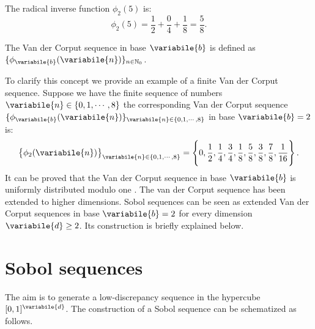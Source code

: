 The radical inverse function $\phi_2(5)$ is:
\begin{equation}
\phi_2 (5) = \frac{1}{2}+\frac{0}{4}+\frac{1}{8} = \frac{5}{8}.
\end{equation}
\begin{definition}
The Van der Corput sequence in base $\variabile{b}$ is defined as $\{ \phi_{\variabile{b}}(\variabile{n})\}_{n\in\mathbb{N}_0}$.
\end{definition}
To clarify this concept we provide an example of a finite Van der Corput sequence.
Suppose we have the finite sequence of numbers $\variabile{n}\in \{0, 1,\cdots, 8\}$  the corresponding Van der Corput sequence 
$\{ \phi_{\variabile{b}}(\variabile{n})\}_{\variabile{n}\in \{0, 1,\cdots, 8\}}$ in base $\variabile{b}=2$ is:
\begin{equation}
\big\{\phi_2(\variabile{n})\big\}_{\variabile{n}\in \{0, 1,\cdots, 8\}} = \Bigg\{0, \frac{1}{2}, \frac{1}{4}, \frac{3}{4}, \frac{1}{8},\frac{5}{8}, \frac{3}{8}, \frac{7}{8}, \frac{1}{16}\Bigg\} \,.
\end{equation}
It can be proved that the Van der Corput sequence in base $\variabile{b}$ is uniformly distributed modulo one \cite{leobacher2014introduction}. 
The van der Corput sequence has been extended to higher dimensions. 
Sobol sequences can be seen as extended Van der Corput sequences in base $\variabile{b}=2$ for every dimension $\variabile{d}\geq2$. Its construction is briefly explained below.
\section{Sobol sequences}
The aim is to generate a low-discrepancy sequence in the hypercube $[0,1]^{\variabile{d}}$. 
The construction of a Sobol sequence can be schematized as follows. 


